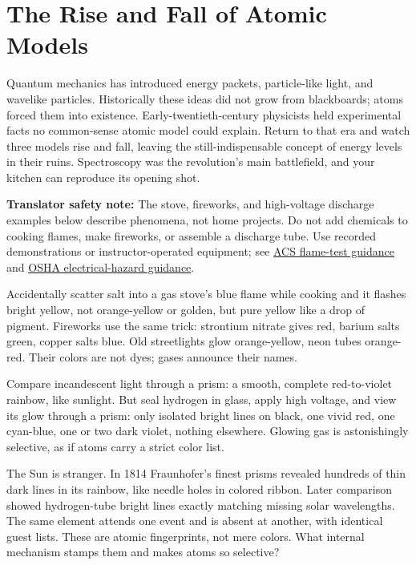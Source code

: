 \chapter{The Rise and Fall of Atomic Models}

Quantum mechanics has introduced energy packets, particle-like light, and wavelike particles. Historically these ideas did not grow from blackboards; atoms forced them into existence. Early-twentieth-century physicists held experimental facts no common-sense atomic model could explain. Return to that era and watch three models rise and fall, leaving the still-indispensable concept of energy levels in their ruins. Spectroscopy was the revolution's main battlefield, and your kitchen can reproduce its opening shot.


\begin{mainline}
\textbf{Translator safety note:} The stove, fireworks, and high-voltage discharge examples below describe phenomena, not home projects. Do not add chemicals to cooking flames, make fireworks, or assemble a discharge tube. Use recorded demonstrations or instructor-operated equipment; see \href{https://institute.acs.org/acs-center/lab-safety/education-training/safer-experiments/flame-test.html}{ACS flame-test guidance} and \href{https://www.osha.gov/etools/poultry-processing/plant-wide-hazards/electrical-hazards}{OSHA electrical-hazard guidance}.

Accidentally scatter salt into a gas stove's blue flame while cooking and it flashes bright yellow, not orange-yellow or golden, but pure yellow like a drop of pigment. Fireworks use the same trick: strontium nitrate gives red, barium salts green, copper salts blue. Old streetlights glow orange-yellow, neon tubes orange-red. Their colors are not dyes; gases announce their names.

Compare incandescent light through a prism: a smooth, complete red-to-violet rainbow, like sunlight. But seal hydrogen in glass, apply high voltage, and view its glow through a prism: only isolated bright lines on black, one vivid red, one cyan-blue, one or two dark violet, nothing elsewhere. Glowing gas is astonishingly selective, as if atoms carry a strict color list.

The Sun is stranger. In 1814 Fraunhofer's finest prisms revealed hundreds of thin dark lines in its rainbow, like needle holes in colored ribbon. Later comparison showed hydrogen-tube bright lines exactly matching missing solar wavelengths. The same element attends one event and is absent at another, with identical guest lists. These are atomic fingerprints, not mere colors. What internal mechanism stamps them and makes atoms so selective?
\end{mainline}

